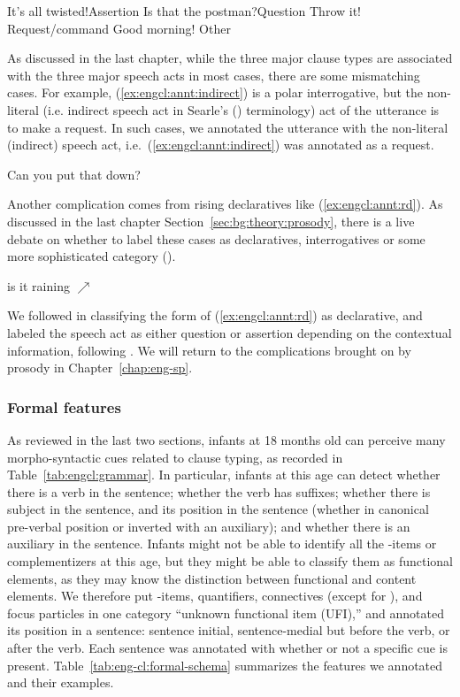 \bxl\label{ex:engcl:annt:sp:a} It’s all twisted!\hfill	Assertion
\ex\label{ex:engcl:annt:sp:q} Is that the postman?\hfill		Question
\ex\label{ex:engcl:annt:sp:r} Throw it!	\hfill		Request/command
\ex \label{ex:engcl:annt:sp:o} Good morning! \hfill Other
\exl
\eex

As discussed in the last chapter, while the three major clause types are associated with the three major speech acts in most cases, there are some mismatching cases. For example, (\ref{ex:engcl:annt:indirect}) is a polar interrogative, but the non-literal (i.e. indirect speech act in Searle's (\cite*{searle1975indirect}) terminology) act of the utterance is to make a request.
In such cases, we annotated the utterance with the non-literal (indirect) speech act, i.e.\ (\ref{ex:engcl:annt:indirect}) was annotated as a request.

Can you put that down?
\eex 

Another complication comes from rising declaratives like (\ref{ex:engcl:annt:rd}). As discussed in the last chapter Section~\ref{sec:bg:theory:prosody}, there is a live debate on whether to label these cases as declaratives, interrogatives or some more sophisticated category (\cite{gunlogson2008,  farkasroelofsen2017}). 

is it raining $\nearrow$
\eex

We followed \textcite{gunlogson2008} in classifying the form of (\ref{ex:engcl:annt:rd}) as declarative, and labeled the speech act as either question or assertion depending on the contextual information, following \textcite{jeong2018, goodhue2021rd}. We will return to the complications brought on by prosody in Chapter~\ref{chap:eng-sp}.

\subsubsection{Formal features}

As reviewed in the last two sections, infants at 18 months old can perceive many morpho-syntactic cues related to clause typing, as recorded in Table~\ref{tab:engcl:grammar}. In particular, infants at this age can detect whether there is a verb in the sentence; whether the verb has suffixes; whether there is subject in the sentence, and its position in the sentence (whether in canonical pre-verbal position or inverted with an auxiliary); and whether there is an auxiliary in the sentence. Infants might not be able to identify all the \twh-items or complementizers at this age, but they might be able to classify them as functional elements, as they may know the distinction between functional and content elements. We therefore put \twh-items, quantifiers, connectives (except for ), and focus particles in one category ``unknown functional item (UFI),'' and annotated its position in a sentence: sentence initial, sentence-medial but before the verb, or after the verb. Each sentence was annotated with whether or not a specific cue is present. Table~\ref{tab:eng-cl:formal-schema} summarizes the features we annotated and their examples.  


